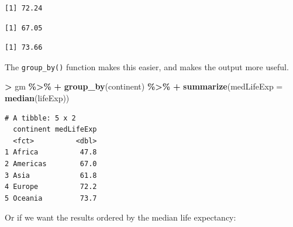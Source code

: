 \documentclass[
]{krantz}
\makeatletter
\newenvironment{Shaded}{\begin{snugshade}}{\end{snugshade}}
\newcommand{\DataTypeTok}[1]{\textcolor[rgb]{0.27,0.27,0.27}{#1}}
\newcommand{\KeywordTok}[1]{\textcolor[rgb]{0.27,0.27,0.27}{\textbf{#1}}}
\newcommand{\NormalTok}[1]{#1}
\newcommand{\OperatorTok}[1]{\textcolor[rgb]{0.43,0.43,0.43}{\textbf{#1}}}
\newcommand{\StringTok}[1]{\textcolor[rgb]{0.5,0.5,0.5}{#1}}
\newenvironment{kframe}{%
\medskip{}
\setlength{\fboxsep}{.8em}
 \def\at@end@of@kframe{}%
 \ifinner\ifhmode%
  \def\at@end@of@kframe{\end{minipage}}%
  \begin{minipage}{\columnwidth}%
 \fi\fi%
 \def\FrameCommand##1{\hskip\@totalleftmargin \hskip-\fboxsep
 \colorbox{shadecolor}{##1}\hskip-\fboxsep
     \hskip-\linewidth \hskip-\@totalleftmargin \hskip\columnwidth}%
 \MakeFramed {\advance\hsize-\width
   \@totalleftmargin\z@ \linewidth\hsize
   \@setminipage}}%
 {\par\unskip\endMakeFramed%
 \at@end@of@kframe}
\renewenvironment{Shaded}{\begin{kframe}}{\end{kframe}}
\makeatother
\begin{document}
\begin{verbatim}
[1] 72.24
\end{verbatim}

\begin{Shaded}
\end{Shaded}

\begin{verbatim}
[1] 67.05
\end{verbatim}

\begin{Shaded}
\end{Shaded}

\begin{verbatim}
[1] 73.66
\end{verbatim}

The \texttt{group\_by()} function makes this easier, and makes the output more useful.

\begin{Shaded}
\begin{Highlighting}[]
\OperatorTok{\textgreater{}}\StringTok{ }\NormalTok{gm }\OperatorTok{\%\textgreater{}\%}\StringTok{ }
\OperatorTok{+}\StringTok{   }\KeywordTok{group\_by}\NormalTok{(continent) }\OperatorTok{\%\textgreater{}\%}\StringTok{ }
\OperatorTok{+}\StringTok{   }\KeywordTok{summarize}\NormalTok{(}\DataTypeTok{medLifeExp =} \KeywordTok{median}\NormalTok{(lifeExp)) }
\end{Highlighting}
\end{Shaded}

\begin{verbatim}
# A tibble: 5 x 2
  continent medLifeExp
  <fct>          <dbl>
1 Africa          47.8
2 Americas        67.0
3 Asia            61.8
4 Europe          72.2
5 Oceania         73.7
\end{verbatim}

Or if we want the results ordered by the median life expectancy:
\end{document}
